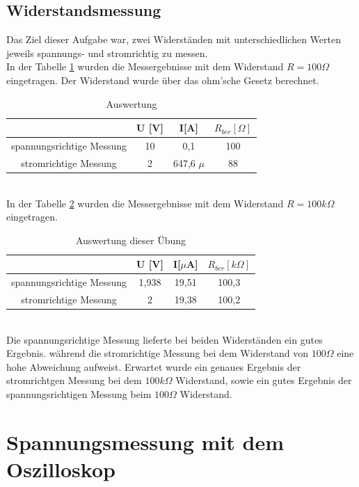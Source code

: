 \subsection{Widerstandsmessung}
Das Ziel dieser Aufgabe war, zwei Widerständen mit unterschiedlichen Werten jeweils spannungs- und stromrichtig zu messen.\\
In der Tabelle \ref{tb:r_100} wurden die Messergebnisse mit dem Widerstand $R=100 \Omega$ eingetragen. Der Widerstand wurde über das ohm'sche Gesetz berechnet. \\
\begin{table}[h]
	\centering
	\begin{tabular}{|c|c|c|c|}
	\hline 
						& U [V]	& I[A]			& $R_{ber} [\Omega]$		\\ 
	\hline 
	spannungsrichtige Messung	& 10		& 0,1			& 100		\\ 
	\hline 
	stromrichtige Messung		& 2		& 647,6 $\mu$	& 88		\\ 
	\hline 
	\end{tabular}
	\caption{Auswertung }
	\label{tb:r_100}
\end{table}
~\\
In der Tabelle \ref{tb:r_100k} wurden die Messergebnisse mit dem Widerstand $R=100 k\Omega$ eingetragen.\\
\begin{table}[h]
	\centering
	\begin{tabular}{|c|c|c|c|}
	\hline 
						& U [V]	& I[$\mu$A]		& $R_{ber} [k\Omega]$		\\ 
	\hline 
	spannungsrichtige Messung	& 1,938	& 19,51		& 100,3		\\ 
	\hline 
	stromrichtige Messung		& 2		& 19,38		& 100,2		\\ 
	\hline 
	\end{tabular}
	\caption{Auswertung dieser Übung}
	\label{tb:r_100k}
\end{table}
~\\
Die spannungsrichtige Messung lieferte bei beiden Widerständen ein gutes Ergebnis. während die stromrichtige Messung bei dem Widerstand von $100 \Omega$ eine hohe Abweichung aufweist. Erwartet wurde ein genaues Ergebnis
der stromrichtgen Messung bei dem $100 k\Omega$ Widerstand, sowie ein gutes Ergebnis
der spannungsrichtigen Messung beim $100 \Omega$ Widerstand.

\newpage

\section{Spannungsmessung mit dem Oszilloskop}

